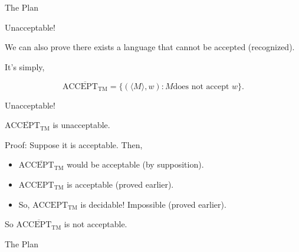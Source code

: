 \documentclass[12pt,compress]{beamer}
\begin{document}
\begin{frame}{The Plan}

  

\end{frame}

\begin{frame}{Unacceptable!}

  We can also prove there exists a language that cannot be accepted
  (recognized).

  \vskip 0.25in

  It's simply,

  \begin{equation*}
    \overline{\text{ACCEPT}_{\text{TM}}} = \{ (\langle M \rangle, w) : M \text{
      does not accept } w\}.
  \end{equation*}

\end{frame}

\begin{frame}{Unacceptable!}

  $\overline{\text{ACCEPT}_{\text{TM}}}$ is unacceptable.

  \vskip 0.25in

  Proof: Suppose it is acceptable. Then,

  \begin{itemize}

  \item $\overline{\text{ACCEPT}_{\text{TM}}}$ would be acceptable (by
    supposition).

  \item $\text{ACCEPT}_{\text{TM}}$ is acceptable (proved earlier).

  \item So, $\text{ACCEPT}_{\text{TM}}$ is decidable! Impossible (proved earlier).

  \end{itemize}

  So $\overline{\text{ACCEPT}_{\text{TM}}}$ is not acceptable.

\end{frame}

\begin{frame}{The Plan}

  

\end{frame}
\end{document}
